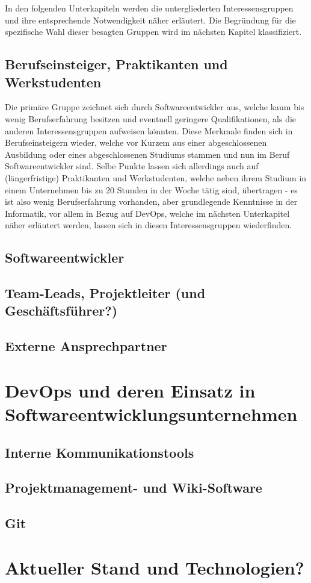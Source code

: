 In den folgenden Unterkapiteln werden die untergliederten Interessensgruppen und ihre entsprechende Notwendigkeit näher erläutert. Die Begründung für die spezifische Wahl dieser besagten Gruppen wird im
nächsten Kapitel klassifiziert.

\subsection{Berufseinsteiger, Praktikanten und Werkstudenten}
Die primäre Gruppe zeichnet sich durch Softwareentwickler aus, welche kaum bis wenig Berufserfahrung besitzen und eventuell geringere Qualifikationen, als die anderen Interessensgruppen aufweisen könnten.
Diese Merkmale finden sich in Berufseinsteigern wieder, welche vor Kurzem aus einer abgeschlossenen Ausbildung oder eines abgeschlossenen Studiums stammen und nun im Beruf Softwareentwickler sind. Selbe Punkte
lassen sich allerdings auch auf (längerfristige) Praktikanten und Werkstudenten, welche neben ihrem Studium in einem Unternehmen bis zu 20 Stunden in der Woche tätig sind, übertragen - es ist also wenig Berufserfahrung
vorhanden, aber grundlegende Kenntnisse in der Informatik, vor allem in Bezug auf DevOps, welche im nächsten Unterkapitel näher erläutert werden, lassen sich in diesen Interessensgruppen wiederfinden.

\subsection{Softwareentwickler}

\subsection{Team-Leads, Projektleiter (und Geschäftsführer?)}

\subsection{Externe Ansprechpartner}

\section{DevOps und deren Einsatz in Softwareentwicklungsunternehmen}

\subsection{Interne Kommunikationstools}

\subsection{Projektmanagement- und Wiki-Software}

\subsection{Git}

\section{Aktueller Stand und Technologien?}
